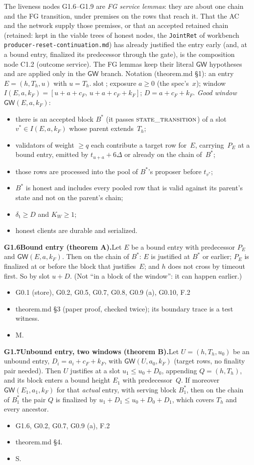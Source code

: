 \documentclass{article}
\newcommand{\slot}{\operatorname{slot}}
\newcommand{\fname}[1]{\text{\textsc{#1}}}
\newcommand{\cF}{c_F}
\newcommand{\dagnode}[6]{%
\par\medskip\noindent\textbf{#1\enspace #2.}\enspace #3
\begin{itemize}[leftmargin=2.2em,itemsep=0pt,topsep=2pt]
\item[\emph{Uses}] #4
\item[\emph{Evid.}] #5
\item[\emph{Task}] #6
\end{itemize}}
\begin{document}
The liveness nodes G1.6--G1.9 are \emph{FG service lemmas}: they are about
one chain and the FG transition, under premises on the rows that reach it.
That the AC and the network supply those premises, or that an accepted
retained chain (retained: kept in the viable trees of honest nodes, the
\texttt{JointRet} of workbench \texttt{producer-reset-continuation.md}) has
already justified the entry early (and, at a bound entry,
finalized its predecessor through the gate), is the composition node C1.2
(outcome service).  The FG lemmas keep their literal $\mathsf{GW}$ hypotheses
and are applied only in the $\mathsf{GW}$ branch.  Notation (theorem.md \S1): an entry $E=(h,T_h,u)$ with $u=T_h.\slot$;
exposure $a\geq0$ (the spec's~$x$); window $I(E,a,k_F)=[u+a+\cF,\,
u+a+\cF+k_F]$; $D=a+\cF+k_F$.  \emph{Good window} $\mathsf{GW}(E,a,k_F)$:
\begin{itemize}[itemsep=0pt,topsep=2pt]
\item[P1] there is an accepted block $B^*$ (it passes
  $\fname{state\_transition}$) of a slot $v^*\in I(E,a,k_F)$ whose parent
  extends~$T_h$;
\item[P2] validators of weight $\geq q$ each contribute a target row for~$E$,
  carrying~$P_E$ at a bound entry, emitted by $t_{u+a}+6\Delta$ or already
  on the chain of~$B^*$;
\item[P3--P4] those rows are processed into the pool of $B^*$'s proposer
  before $t_{v^*}$;
\item[P5] $B^*$ is honest and includes every pooled row that is valid against
  its parent's state and not on the parent's chain;
\item[P6] $\delta_{\mathrm t}\geq D$ and $K_W\geq1$;
\item[P7] honest clients are durable and serialized.
\end{itemize}

\dagnode{G1.6}{Bound entry (theorem A)}{Let $E$ be a bound entry with
predecessor $P_E$ and $\mathsf{GW}(E,a,k_F)$.  Then on the chain of $B^*$:
$E$ is justified at $B^*$ or earlier; $P_E$ is finalized at or before the
block that justifies~$E$; and $h$ does not cross by timeout first.  So by
slot $u+D$.  (Not ``in a block of the window'': it can happen earlier.)}
{G0.1 (store), G0.2, G0.5, G0.7, G0.8, G0.9 (a), G0.10, F.2}{theorem.md \S3 (paper proof, checked
twice); its boundary trace is a test witness.}{M.}

\dagnode{G1.7}{Unbound entry, two windows (theorem B)}{Let $U=(h,T_h,u_0)$
be an unbound entry, $D_i=a_i+\cF+k_F$, with $\mathsf{GW}(U,a_0,k_F)$ (target rows, no finality pair
needed).  Then $U$ justifies at a slot $u_1\leq u_0+D_0$, appending
$Q=(h,T_h)$, and its block enters a bound height $E_1$ with predecessor~$Q$.
If moreover $\mathsf{GW}(E_1,a_1,k_F)$ for that \emph{actual} entry, with
serving block $B^*_1$, then on the chain of $B^*_1$ the pair $Q$ is finalized
by $u_1+D_1\leq u_0+D_0+D_1$, which covers $T_h$ and every ancestor.}
{G1.6, G0.2, G0.7, G0.9 (a), F.2}{theorem.md \S4.}{S.}
\end{document}
